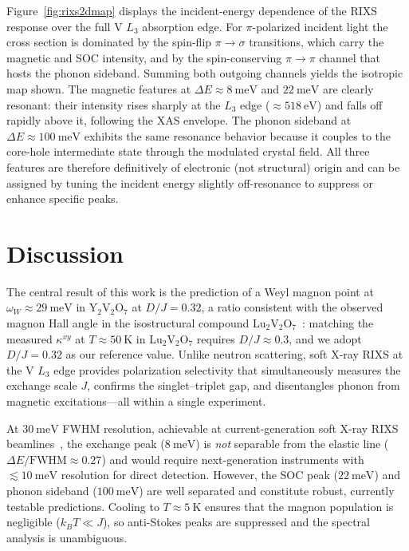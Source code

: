 \documentclass[aps,prb,twocolumn,superscriptaddress,longbibliography]{revtex4-2}
\begin{document}
Figure~\ref{fig:rixs2dmap} displays the incident-energy dependence of the
RIXS response over the full V $L_3$ absorption edge.
For $\pi$-polarized incident light the cross section is dominated by the
spin-flip $\pi \to \sigma$ transitions, which carry the magnetic and SOC
intensity, and by the spin-conserving $\pi \to \pi$ channel that hosts the
phonon sideband.
Summing both outgoing channels yields the isotropic map shown.
The magnetic features at $\Delta E \approx \SI{8}{\milli\eV}$ and
$\SI{22}{\milli\eV}$ are clearly resonant: their intensity rises sharply at
the $L_3$ edge ($\approx \SI{518}{\eV}$) and falls off rapidly above it,
following the XAS envelope.
The phonon sideband at $\Delta E \approx \SI{100}{\milli\eV}$ exhibits the
same resonance behavior because it couples to the core-hole intermediate
state through the modulated crystal field.
All three features are therefore definitively of electronic (not structural)
origin and can be assigned by tuning the incident energy slightly off-resonance
to suppress or enhance specific peaks.

\section{Discussion}
\label{sec:discussion}

The central result of this work is the prediction of a Weyl magnon point
at $\omega_W \approx \SI{29}{\milli\eV}$ in Y$_2$V$_2$O$_7$ at
$D/J = 0.32$, a ratio consistent with the observed magnon Hall angle in the
isostructural compound Lu$_2$V$_2$O$_7$~\cite{Onose2010}: matching the
measured $\kappa^{xy}$ at $T \approx \SI{50}{\kelvin}$ in Lu$_2$V$_2$O$_7$
requires $D/J \approx 0.3$, and we adopt $D/J = 0.32$ as our reference value.
Unlike neutron scattering, soft X-ray RIXS at the V $L_3$ edge provides
polarization selectivity that simultaneously measures the exchange scale $J$,
confirms the singlet--triplet gap, and disentangles phonon from magnetic
excitations---all within a single experiment.

At $\SI{30}{\milli\eV}$ FWHM resolution, achievable at current-generation soft
X-ray RIXS beamlines~\cite{Ament2011}, the exchange peak ($\SI{8}{\milli\eV}$)
is \emph{not} separable from the elastic line ($\Delta E/\text{FWHM} \approx 0.27$)
and would require next-generation instruments with $\lesssim \SI{10}{\milli\eV}$
resolution for direct detection.
However, the SOC peak ($\SI{22}{\milli\eV}$) and phonon sideband
($\SI{100}{\milli\eV}$) are well separated and constitute robust, currently
testable predictions.
Cooling to $T \approx \SI{5}{\kelvin}$ ensures that the magnon population
is negligible ($k_B T \ll J$), so anti-Stokes peaks are suppressed and the
spectral analysis is unambiguous.
\end{document}
